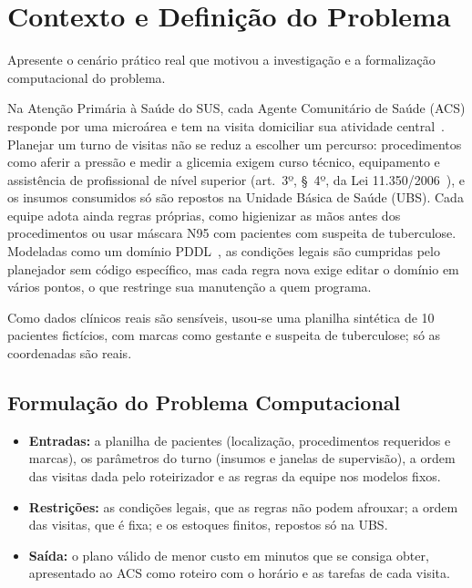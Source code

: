 \documentclass[11pt,a4paper]{article}
\begin{document}
\section{Contexto e Definição do Problema}

\begin{instrucao}
Apresente o cenário prático real que motivou a investigação e a formalização computacional do problema.
\end{instrucao}

Na Atenção Primária à Saúde do SUS, cada Agente Comunitário de Saúde (ACS) responde por uma microárea e tem na visita domiciliar sua atividade central~\cite{pnab}. Planejar um turno de visitas não se reduz a escolher um percurso: procedimentos como aferir a pressão e medir a glicemia exigem curso técnico, equipamento e assistência de profissional de nível superior (art.~3º, §~4º, da Lei 11.350/2006~\cite{lei11350,lei13595}), e os insumos consumidos só são repostos na Unidade Básica de Saúde (UBS). Cada equipe adota ainda regras próprias, como higienizar as mãos antes dos procedimentos ou usar máscara N95 com pacientes com suspeita de tuberculose. Modeladas como um domínio PDDL~\cite{pddl}, as condições legais são cumpridas pelo planejador sem código específico, mas cada regra nova exige editar o domínio em vários pontos, o que restringe sua manutenção a quem programa.

Como dados clínicos reais são sensíveis, usou-se uma planilha sintética de 10 pacientes fictícios, com marcas como gestante e suspeita de tuberculose; só as coordenadas são reais.

\subsection{Formulação do Problema Computacional}
\begin{itemize}
    \item \textbf{Entradas:} a planilha de pacientes (localização, procedimentos requeridos e marcas), os parâmetros do turno (insumos e janelas de supervisão), a ordem das visitas dada pelo roteirizador e as regras da equipe nos modelos fixos.
    \item \textbf{Restrições:} as condições legais, que as regras não podem afrouxar; a ordem das visitas, que é fixa; e os estoques finitos, repostos só na UBS.
    \item \textbf{Saída:} o plano válido de menor custo em minutos que se consiga obter, apresentado ao ACS como roteiro com o horário e as tarefas de cada visita.
\end{itemize}
\end{document}
